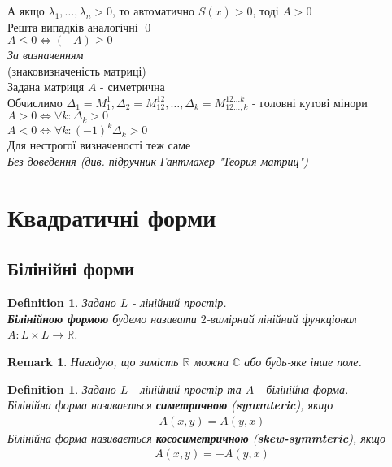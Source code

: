 \documentclass[a4paper, 10pt]{article}
\theoremstyle{theoremdd}
\newtheorem{definition}[theorem]{Definition}
\newtheorem{remark}[theorem]{Remark}
\begin{document}
А якщо $\lambda_1,\dots,\lambda_n > 0$, то автоматично $S(x) > 0$, тоді $A>0$\\
Решта випадків аналогічні \qed
\bigskip \\
 $A \leq 0 \iff (-A) \geq 0$\\
\textit{За визначенням}
\bigskip \\
 (знаковизначеність матриці)\\
Задана матриця $A$ - симетрична\\
Обчислимо $\Delta_1 = M_1^1, \Delta_2 = M_{12}^{12}, \dots, \Delta_k = M^{12\dots k}_{12 \dots, k}$ - головні кутові мінори\\
$A>0 \iff \forall k: \Delta_k > 0$\\
$A < 0 \iff \forall k: (-1)^k \Delta_k > 0$\\
Для нестрогої визначеності теж саме\\
\textit{Без доведення (див. підручник Гантмахер "Теория матриц")}
\bigskip \\
\fi

\newpage


\section{Квадратичні форми}
\subsection{Білінійні форми}
\begin{definition}
Задано $L$ - лінійний простір.\\
\textbf{Білінійною формою} будемо називати $2$-вимірний лінійний функціонал $A \colon L \times L \to \mathbb{R}$.
\end{definition}

\begin{remark}
Нагадую, що замість $\mathbb{R}$ можна $\mathbb{C}$ або будь-яке інше поле.
\end{remark}

\begin{definition}
Задано $L$ - лінійний простір та $A$ - білінійна форма.\\
Білінійна форма називається \textbf{симетричною} (\textbf{symmteric}), якщо
\begin{align*}
A(x,y) = A(y,x)
\end{align*}
Білінійна форма називається \textbf{кососиметричною} (\textbf{skew-symmteric}), якщо
\begin{align*}
A(x,y) = -A(y,x)
\end{align*}
\end{definition}
\end{document}
